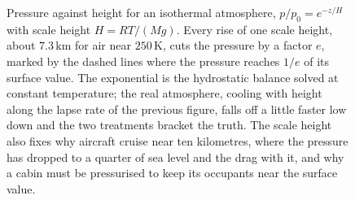 \begin{figure}[htbp]
\centering
{}
\caption[The isothermal-atmosphere barometric profile]{Pressure against height
for an isothermal atmosphere, $p/p_0=e^{-z/H}$ with scale height $H=RT/(Mg)$.
Every rise of one scale height, about $7.3\,\text{km}$ for air near
$250\,\si{\kelvin}$, cuts the pressure by a factor $e$, marked by the dashed
lines where the pressure reaches $1/e$ of its surface value. The exponential is
the hydrostatic balance solved at constant temperature; the real atmosphere,
cooling with height along the lapse rate of the previous figure, falls off a
little faster low down and the two treatments bracket the truth. The scale
height also fixes why aircraft cruise near ten kilometres, where the pressure
has dropped to a quarter of sea level and the drag with it, and why a cabin must
be pressurised to keep its occupants near the surface value.}
\label{fig:vol04ch01:barometric}
\end{figure}

